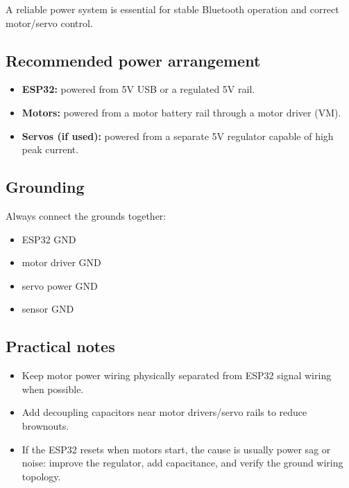 A reliable power system is essential for stable Bluetooth operation and correct motor/servo control.

\subsection{Recommended power arrangement}
\begin{itemize}
    \item \textbf{ESP32:} powered from 5V USB or a regulated 5V rail.
    \item \textbf{Motors:} powered from a motor battery rail through a motor driver (VM).
    \item \textbf{Servos (if used):} powered from a separate 5V regulator capable of high peak current.
\end{itemize}

\subsection{Grounding}
Always connect the grounds together:
\begin{itemize}
    \item ESP32 GND
    \item motor driver GND
    \item servo power GND
    \item sensor GND
\end{itemize}

\subsection{Practical notes}
\begin{itemize}
    \item Keep motor power wiring physically separated from ESP32 signal wiring when possible.
    \item Add decoupling capacitors near motor drivers/servo rails to reduce brownouts.
    \item If the ESP32 resets when motors start, the cause is usually power sag or noise: improve the regulator,
    add capacitance, and verify the ground wiring topology.
\end{itemize}